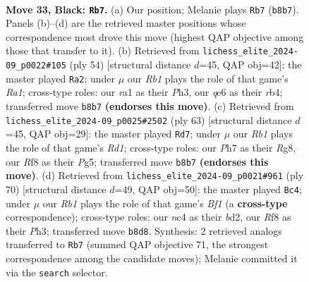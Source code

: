 \documentclass[11pt]{article}
\begin{document}
\clearpage

\begin{figure}[p]\centering
\begin{subfigure}{0.46\textwidth}\centering
\resizebox{\linewidth}{!}{%
\newchessgame
\chessboard[
  setfen={1r3r2/6kp/1p2Q3/p7/2N4P/8/PP3PP1/R5K1 b - - 4 33},
  showmover=false,
  pgfstyle=straightmove, color=movearrow, markmove={b8-b7}
]}
\caption{}
\end{subfigure}\hfill
\begin{subfigure}{0.46\textwidth}\centering
\resizebox{\linewidth}{!}{%
\newchessgame
\chessboard[
  setfen={8/4p1kp/p3p1p1/8/Pr2n3/6PP/4PP2/R1R3K1 w - - 0 28},
  showmover=false,
  pgfstyle=straightmove, color=movearrow, markmove={a1-a2}
]}
\caption{}
\end{subfigure}
\\[4pt]
\begin{subfigure}{0.46\textwidth}\centering
\resizebox{\linewidth}{!}{%
\newchessgame
\chessboard[
  setfen={3r2r1/Q4p2/4k2p/3p2p1/8/4N3/1PP2P1P/1K6 b - - 0 32},
  showmover=false,
  pgfstyle=straightmove, color=movearrow, markmove={d8-d7}
]}
\caption{}
\end{subfigure}\hfill
\begin{subfigure}{0.46\textwidth}\centering
\resizebox{\linewidth}{!}{%
\newchessgame
\chessboard[
  setfen={5rk1/1RR2p2/6n1/7p/1p2PP2/5K1P/3b4/5B2 w - - 3 36},
  showmover=false,
  pgfstyle=straightmove, color=movearrow, markmove={f1-c4}
]}
\caption{}
\end{subfigure}
\caption{\textbf{Move 33, Black: \texttt{Rb7}.} (a) Our position; Melanie plays \texttt{Rb7} (\texttt{b8b7}). Panels (b)--(d) are the retrieved master positions whose correspondence most drove this move (highest QAP objective among those that transfer to it). (b) Retrieved from \texttt{lichess\_elite\_2024-09\_p0022\#105} (ply 54) [structural distance $d$=45, QAP obj=42]: the master played \texttt{Ra2}; under $\mu$ our \emph{Rb1} plays the role of that game's \emph{Ra1}; cross-type roles: our \emph{r}a1 as their \emph{P}h3, our \emph{q}e6 as their \emph{r}b4; transferred move \texttt{b8b7} \textbf{(endorses this move)}. (c) Retrieved from \texttt{lichess\_elite\_2024-09\_p0025\#2502} (ply 63) [structural distance $d$=45, QAP obj=29]: the master played \texttt{Rd7}; under $\mu$ our \emph{Rb1} plays the role of that game's \emph{Rd1}; cross-type roles: our \emph{P}h7 as their \emph{R}g8, our \emph{R}f8 as their \emph{P}g5; transferred move \texttt{b8b7} \textbf{(endorses this move)}. (d) Retrieved from \texttt{lichess\_elite\_2024-09\_p0021\#961} (ply 70) [structural distance $d$=49, QAP obj=50]: the master played \texttt{Bc4}; under $\mu$ our \emph{Rb1} plays the role of that game's \emph{Bf1} (a \textbf{cross-type} correspondence); cross-type roles: our \emph{n}c4 as their \emph{b}d2, our \emph{R}f8 as their \emph{P}h3; transferred move \texttt{b8d8}. Synthesis: 2 retrieved analogs transferred to \texttt{Rb7} (summed QAP objective 71, the strongest correspondence among the candidate moves); Melanie committed it via the \texttt{search} selector.}
\label{fig:thought-m65}
\end{figure}
\end{document}
